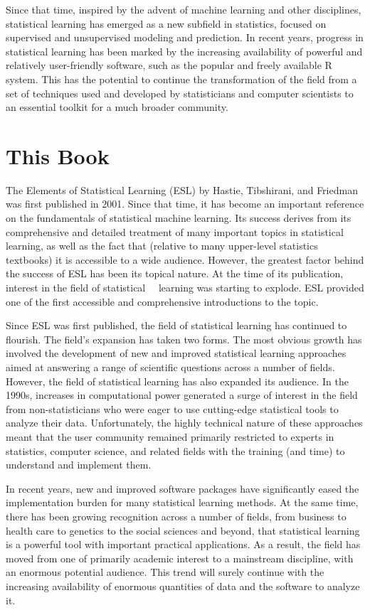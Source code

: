 \documentclass[10pt]{article}
\begin{document}
Since that time, inspired by the advent of machine learning and other disciplines, statistical learning has emerged as a new subfield in statistics, focused on supervised and unsupervised modeling and prediction. In recent years, progress in statistical learning has been marked by the increasing availability of powerful and relatively user-friendly software, such as the popular and freely available R system. This has the potential to continue the transformation of the field from a set of techniques used and developed by statisticians and computer scientists to an essential toolkit for a much broader community.

\section*{This Book}
The Elements of Statistical Learning (ESL) by Hastie, Tibshirani, and Friedman was first published in 2001. Since that time, it has become an important reference on the fundamentals of statistical machine learning. Its success derives from its comprehensive and detailed treatment of many important topics in statistical learning, as well as the fact that (relative to many upper-level statistics textbooks) it is accessible to a wide audience. However, the greatest factor behind the success of ESL has been its topical nature. At the time of its publication, interest in the field of statistical\
\
learning was starting to explode. ESL provided one of the first accessible and comprehensive introductions to the topic.

Since ESL was first published, the field of statistical learning has continued to flourish. The field's expansion has taken two forms. The most obvious growth has involved the development of new and improved statistical learning approaches aimed at answering a range of scientific questions across a number of fields. However, the field of statistical learning has also expanded its audience. In the 1990s, increases in computational power generated a surge of interest in the field from non-statisticians who were eager to use cutting-edge statistical tools to analyze their data. Unfortunately, the highly technical nature of these approaches meant that the user community remained primarily restricted to experts in statistics, computer science, and related fields with the training (and time) to understand and implement them.

In recent years, new and improved software packages have significantly eased the implementation burden for many statistical learning methods. At the same time, there has been growing recognition across a number of fields, from business to health care to genetics to the social sciences and beyond, that statistical learning is a powerful tool with important practical applications. As a result, the field has moved from one of primarily academic interest to a mainstream discipline, with an enormous potential audience. This trend will surely continue with the increasing availability of enormous quantities of data and the software to analyze it.
\end{document}
